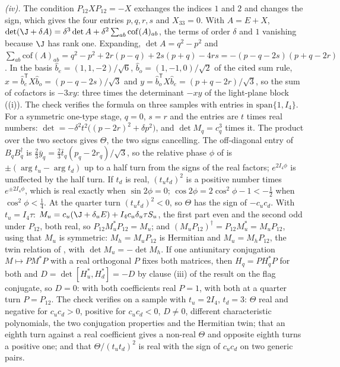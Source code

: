 \emph{(iv).} The condition $P_{12}XP_{12} = -X$ exchanges the indices $1$ and $2$ and changes the sign, which gives the four entries $p, q, r, s$ and $X_{33} = 0$. With $A = E + X$, $\det(\J + \delta A) = \delta^{3}\det A + \delta^{2}\sum_{ab}\mathrm{cof}(A)_{ab}$, the terms of order $\delta$ and $1$ vanishing because $\J$ has rank one. Expanding, $\det A = q^{2} - p^{2}$ and $\sum_{ab}\mathrm{cof}(A)_{ab} = q^{2} - p^{2} + 2r(p - q) + 2s(p + q) - 4rs = -(p - q - 2s)(p + q - 2r)$. In the basis $\hat{b}_{e} = (1, 1, -2)/\sqrt6$, $\hat{b}_{o} = (1, -1, 0)/\sqrt2$ of the cited sum rule, $x = \hat{b}_{e}^{\mathsf{T}}X\hat{b}_{o} = (p - q - 2s)/\sqrt3$ and $y = \hat{b}_{o}^{\mathsf{T}}X\hat{b}_{e} = (p + q - 2r)/\sqrt3$, so the sum of cofactors is $-3xy$: three times the determinant $-xy$ of the light-plane block ((i)). The check verifies the formula on three samples with entries in $\mathrm{span}\{1, I_{4}\}$. For a symmetric one-type stage, $q = 0$, $s = r$ and the entries are $t$ times real numbers: $\det = -\delta^{2}t^{2}\bigl((p - 2r)^{2} + \delta p^{2}\bigr)$, and $\det M_{q} = c_{q}^{3}$ times it. The product over the two sectors gives $\Theta$, the two signs cancelling. The off-diagonal entry of $B_{q}B_{q}^{\dagger}$ is $\tfrac23\bar{y}_{q} = \tfrac23\bar{t}_{q}(p_{q} - 2r_{q})/\sqrt3$, so the relative phase $\phi$ of  is $\pm(\arg t_{u} - \arg t_{d})$ up to a half turn from the signs of the real factors; $e^{2I_{4}\phi}$ is unaffected by the half turn. If $t_{d}$ is real, $(t_{u}t_{d})^{2}$ is a positive number times $e^{\pm2I_{4}\phi}$, which is real exactly when $\sin2\phi = 0$; $\cos2\phi = 2\cos^{2}\phi - 1 < -\tfrac12$ when $\cos^{2}\phi < \tfrac14$. At the quarter turn $(t_{u}t_{d})^{2} < 0$, so $\Theta$ has the sign of $-c_{u}c_{d}$. With $t_{u} = I_{4}\tau$: $M_{u} = c_{u}(\J + \delta_{u}E) + I_{4}c_{u}\delta_{u}\tau S_{u}$, the first part even and the second odd under $P_{12}$, both real, so $P_{12}M_{u}^{*}P_{12} = M_{u}$; and $(M_{u}P_{12})^{\dagger} = P_{12}M_{u}^{*} = M_{u}P_{12}$, using that $M_{u}$ is symmetric: $M_{h} = M_{u}P_{12}$ is Hermitian and $M_{u} = M_{h}P_{12}$, the twin relation of , with $\det M_{u} = -\det M_{h}$. If one antiunitary conjugation $M \mapsto PM^{*}P$ with a real orthogonal $P$ fixes both matrices, then $H_{q} = PH_{q}^{*}P$ for both and $D = \det[H_{u}^{*}, H_{d}^{*}] = -D$ by clause (iii) of the result on the flag conjugate, so $D = 0$: with both coefficients real $P = 1$, with both at a quarter turn $P = P_{12}$. The check verifies on a sample with $t_{u} = 2I_{4}$, $t_{d} = 3$: $\Theta$ real and negative for $c_{u}c_{d} > 0$, positive for $c_{u}c_{d} < 0$, $D \neq 0$, different characteristic polynomials, the two conjugation properties and the Hermitian twin; that an eighth turn against a real coefficient gives a non-real $\Theta$ and opposite eighth turns a positive one; and that $\Theta/(t_{u}t_{d})^{2}$ is real with the sign of $c_{u}c_{d}$ on two generic pairs.

